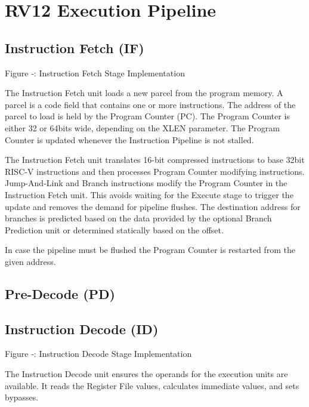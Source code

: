 \section{RV12 Execution Pipeline}


\subsection{Instruction Fetch (IF)}\label{instruction-fetch-if}

\missingfigure{}

Figure ‑: Instruction Fetch Stage Implementation

The Instruction Fetch unit loads a new parcel from the program memory. A
parcel is a code field that contains one or more instructions. The
address of the parcel to load is held by the Program Counter (PC). The
Program Counter is either 32 or 64bits wide, depending on the XLEN
parameter. The Program Counter is updated whenever the Instruction
Pipeline is not stalled.

The Instruction Fetch unit translates 16-bit compressed instructions to
base 32bit RISC-V instructions and then processes Program Counter
modifying instructions. Jump-And-Link and Branch instructions modify the
Program Counter in the Instruction Fetch unit. This avoids waiting for
the Execute stage to trigger the update and removes the demand for
pipeline flushes. The destination address for branches is predicted
based on the data provided by the optional Branch Prediction unit or
determined statically based on the offset.

In case the pipeline must be flushed the Program Counter is restarted
from the given address.

\subsection{Pre-Decode (PD)}\label{pre-decode-pd}

\missingfigure{}

\subsection{Instruction Decode (ID)}\label{instruction-decode-id-1}

\missingfigure{}

Figure ‑: Instruction Decode Stage Implementation

The Instruction Decode unit ensures the operands for the execution units
are available. It reads the Register File values, calculates immediate
values, and sets bypasses.

